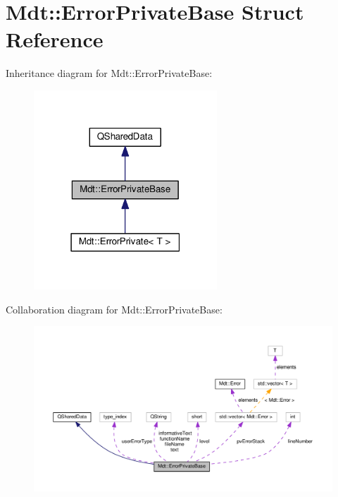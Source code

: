 \hypertarget{struct_mdt_1_1_error_private_base}{}\section{Mdt\+:\+:Error\+Private\+Base Struct Reference}
\label{struct_mdt_1_1_error_private_base}


Inheritance diagram for Mdt\+:\+:Error\+Private\+Base\+:\nopagebreak
\begin{figure}[H]
\begin{center}
\leavevmode
\includegraphics[width=195pt]{struct_mdt_1_1_error_private_base__inherit__graph}
\end{center}
\end{figure}


Collaboration diagram for Mdt\+:\+:Error\+Private\+Base\+:\nopagebreak
\begin{figure}[H]
\begin{center}
\leavevmode
\includegraphics[width=350pt]{struct_mdt_1_1_error_private_base__coll__graph}
\end{center}
\end{figure}
